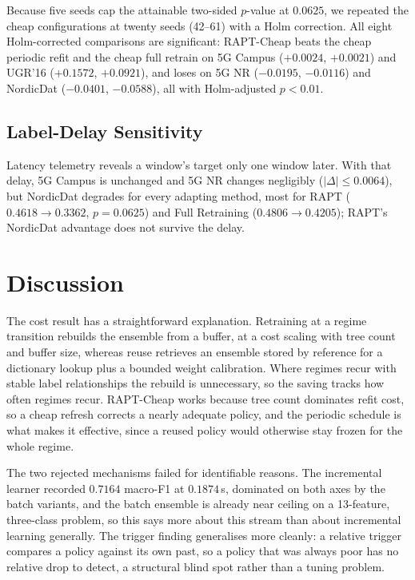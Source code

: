 \documentclass[conference]{IEEEtran}
\begin{document}
Because five seeds cap the attainable two-sided $p$-value at $0.0625$, we repeated the
cheap configurations at twenty seeds (42--61) with a Holm correction. All eight
Holm-corrected comparisons are significant: RAPT-Cheap beats the cheap periodic refit
and the cheap full retrain on 5G Campus ($+0.0024$, $+0.0021$) and UGR'16 ($+0.1572$,
$+0.0921$), and loses on 5G NR ($-0.0195$, $-0.0116$) and NordicDat ($-0.0401$,
$-0.0588$), all with Holm-adjusted $p < 0.01$.

\subsection{Label-Delay Sensitivity}

Latency telemetry reveals a window's target only one window later. With that delay,
5G Campus is unchanged and 5G NR changes negligibly ($|\Delta| \le 0.0064$), but
NordicDat degrades for every adapting method, most for RAPT ($0.4618 \to 0.3362$,
$p = 0.0625$) and Full Retraining ($0.4806 \to 0.4205$); RAPT's NordicDat advantage
does not survive the delay.

\section{Discussion}

The cost result has a straightforward explanation. Retraining at a regime transition
rebuilds the ensemble from a buffer, at a cost scaling with tree count and buffer size,
whereas reuse retrieves an ensemble stored by reference for a dictionary lookup plus a
bounded weight calibration. Where regimes recur with stable label relationships the
rebuild is unnecessary, so the saving tracks how often regimes recur. RAPT-Cheap works
because tree count dominates refit cost, so a cheap refresh corrects a nearly adequate
policy, and the periodic schedule is what makes it effective, since a reused policy
would otherwise stay frozen for the whole regime.

The two rejected mechanisms failed for identifiable reasons. The incremental learner
recorded $0.7164$ macro-F1 at $0.1874$\,s, dominated on both axes by the batch
variants, and the batch ensemble is already near ceiling on a 13-feature, three-class
problem, so this says more about this stream than about incremental learning generally.
The trigger finding generalises more cleanly: a relative trigger compares a policy
against its own past, so a policy that was always poor has no relative drop to detect,
a structural blind spot rather than a tuning problem.
\end{document}
